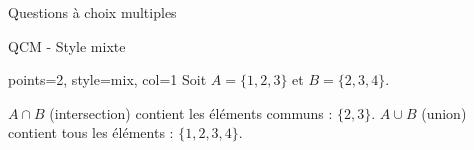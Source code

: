 \documentclass[theme=vert]{nfdevoirs}
\begin{document}
\begin{devoir}
\begin{partie}{Questions à choix multiples}
\begin{exercice}{QCM - Style mixte}
\begin{qcm}{points=2, style=mix, col=1}
                Soit $A = \{1, 2, 3\}$ et $B = \{2, 3, 4\}$.
                \begin{choix}
                \end{choix}
            \end{qcm}

            \begin{correction}
                $A \cap B$ (intersection) contient les éléments communs : $\{2, 3\}$.
                $A \cup B$ (union) contient tous les éléments : $\{1, 2, 3, 4\}$.
            \end{correction}

        \end{exercice}

    \end{partie}

\end{devoir}
\end{document}
